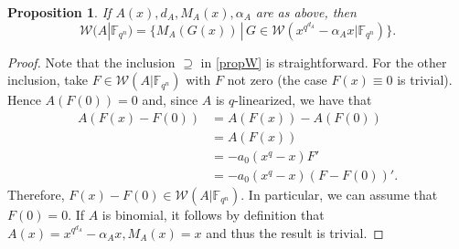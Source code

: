 \documentclass[11pt]{amsart}
\newcommand{\F}{\mathbb{F}}
\newtheorem{proposition}[theorem]{Proposition}
\theoremstyle{definition}
\theoremstyle{remark}
\begin{document}
\begin{proposition}\label{prop:affine}
If $A(x), d_A, M_A(x), \alpha_A$ are as above, then
\begin{equation}\label{propW}
\mathcal W(A|\F_{q^n})=\{M_A(G(x))\,|\, G\in \mathcal W(x^{q^{d_A}}-\alpha_Ax|\F_{q^n})\}.
\end{equation}
\end{proposition}
\begin{proof}
Note that the inclusion $ \supseteq $ in \eqref{propW} is straightforward. For the other inclusion, take $F\in \mathcal W(A|\F_{q^n})$ with $F$ not zero (the case $F(x)\equiv 0$ is trivial). Hence $A(F(0))=0$ and, since $A$ is $q$-linearized, we have that 
\begin{align*}
A(F(x)- F(0))&= A(F(x))- A(F(0)) \\
&=A(F(x))\\&=-a_0(x^q-x)F'\\
&=-a_0(x^q-x)(F- F(0))'.
\end{align*}
Therefore, $F(x)- F(0)\in \mathcal W(A|\F_{q^n})$. In particular, we can assume that $F(0)=0$. If $A$ is binomial, it follows by definition that $A(x)=x^{q^{d_A}}-\alpha_Ax, M_A(x)=x$ and thus the result is trivial. 


\end{proof}
\end{document}
